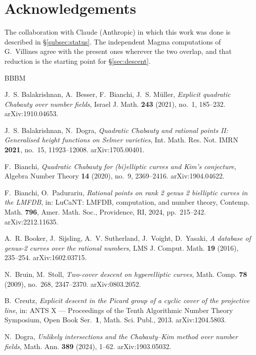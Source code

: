 \documentclass[11pt,reqno]{amsart}
\theoremstyle{plain}
\theoremstyle{definition}
\numberwithin{equation}{section}
\begin{document}
\section*{Acknowledgements}

The collaboration with Claude (Anthropic) in which this work was done is
described in \S\ref{subsec:status}. The independent Magma computations of
G.~Villines \cite{Villines} agree with the present ones wherever the two
overlap, and that reduction is the starting point for \S\ref{sec:descent}.

\begin{thebibliography}{BBBM}

J.~S. Balakrishnan, A.~Besser, F.~Bianchi, J.~S. M\"uller,
\emph{Explicit quadratic Chabauty over number fields},
Israel J. Math. \textbf{243} (2021), no.~1, 185--232. arXiv:1910.04653.

J.~S. Balakrishnan, N.~Dogra,
\emph{Quadratic Chabauty and rational points II: Generalised height functions on
Selmer varieties},
Int. Math. Res. Not. IMRN \textbf{2021}, no.~15, 11923--12008.
arXiv:1705.00401.

F.~Bianchi,
\emph{Quadratic Chabauty for (bi)elliptic curves and Kim's conjecture},
Algebra Number Theory \textbf{14} (2020), no.~9, 2369--2416. arXiv:1904.04622.

F.~Bianchi, O.~Padurariu,
\emph{Rational points on rank 2 genus 2 bielliptic curves in the LMFDB}, in:
LuCaNT: LMFDB, computation, and number theory, Contemp. Math. \textbf{796},
Amer. Math. Soc., Providence, RI, 2024, pp.~215--242. arXiv:2212.11635.

A.~R. Booker, J.~Sijsling, A.~V. Sutherland, J.~Voight, D.~Yasaki,
\emph{A database of genus-2 curves over the rational numbers},
LMS J. Comput. Math. \textbf{19} (2016), 235--254. arXiv:1602.03715.

N.~Bruin, M.~Stoll,
\emph{Two-cover descent on hyperelliptic curves},
Math. Comp. \textbf{78} (2009), no.~268, 2347--2370. arXiv:0803.2052.

B.~Creutz,
\emph{Explicit descent in the Picard group of a cyclic cover of the projective
line}, in: ANTS X --- Proceedings of the Tenth Algorithmic Number Theory
Symposium, Open Book Ser.~\textbf{1}, Math. Sci. Publ., 2013.
arXiv:1204.5803.

N.~Dogra,
\emph{Unlikely intersections and the Chabauty--Kim method over number fields},
Math. Ann. \textbf{389} (2024), 1--62. arXiv:1903.05032.


\end{thebibliography}
\end{document}
